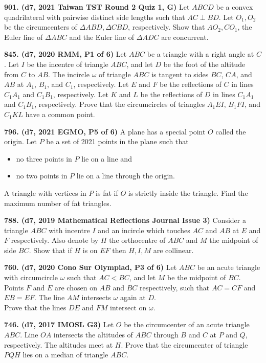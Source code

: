 \documentclass{article}
\begin{document}
\textbf{901. (\color{red}d7\color{black}, 2021 Taiwan TST Round 2 Quiz 1, G)} Let $ABCD$ be a convex quadrilateral with pairwise distinct side lengths such that $AC\perp BD$. Let $O_1,O_2$ be the circumcenters of $\Delta ABD, \Delta CBD$, respectively. Show that $AO_2, CO_1$, the Euler line of $\Delta ABC$ and the Euler line of $\Delta ADC$ are concurrent.

\textbf{845. (\color{red}d7\color{black}, 2020 RMM, P1 of 6)} Let $ABC$ be a triangle with a right angle at $C$. Let $I$ be the incentre of triangle $ABC$, and let $D$ be the foot of the altitude from $C$ to $AB$. The incircle $\omega$ of triangle $ABC$ is tangent to sides $BC$, $CA$, and $AB$ at $A_1$, $B_1$, and $C_1$, respectively. Let $E$ and $F$ be the reflections of $C$ in lines $C_1A_1$ and $C_1B_1$, respectively. Let $K$ and $L$ be the reflections of $D$ in lines $C_1A_1$ and $C_1B_1$, respectively.
Prove that the circumcircles of triangles $A_1EI$, $B_1FI$, and $C_1KL$ have a common point.

\textbf{796. (\color{red}d7\color{black}, 2021 EGMO, P5 of 6)} A plane has a special point $O$ called the origin. Let $P$ be a set of 2021 points in the plane such that
\begin{itemize}
    \item no three points in $P$ lie on a line and
    \item no two points in $P$ lie on a line through the origin.
\end{itemize}
A triangle with vertices in $P$ is fat if $O$ is strictly inside the triangle. Find the maximum number of fat triangles.

\textbf{788. (\color{red}d7\color{black}, 2019 Mathematical Reflections Journal Issue 3)} Consider a triangle $ABC$ with incentre $I$ and an incircle which touches $AC$ and $AB$ at $E$ and $F$ respectively. Also denote by $H$ the orthocentre of $ABC$ and $M$ the midpoint of side $BC.$ Show that if $H$ is on $EF$ then $H, I, M$ are collinear.

\textbf{760. (\color{red}d7\color{black}, 2020 Cono Sur Olympiad, P3 of 6)} Let $A B C$ be an acute triangle with circumcircle $\omega$ such that $A C<B C$, and let $M$ be the midpoint of $B C$. Points $F$ and $E$ are chosen on $A B$ and $B C$ respectively, such that $A C=C F$ and $E B=E F$. The line $A M$ intersects $\omega$ again at $D$.\\

Prove that the lines $D E$ and $F M$ intersect on $\omega$.

\textbf{746. (\color{red}d7\color{black}, 2017 IMOSL G3)} Let $O$ be the circumcenter of an acute triangle $ABC$. Line $OA$ intersects the altitudes of $ABC$ through $B$ and $C$ at $P$ and $Q$, respectively. The altitudes meet at $H$. Prove that the circumcenter of triangle $PQH$ lies on a median of triangle $ABC$.
\end{document}
